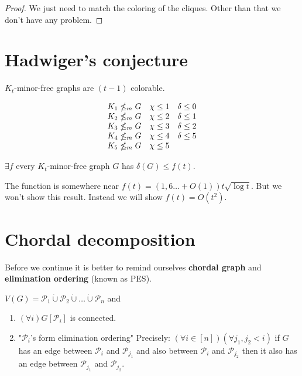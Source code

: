 \begin{proof}
	We just need to match the coloring of the cliques. Other than that we don't have any problem.
\end{proof}

\section{Hadwiger's conjecture}

$K_{t}$-minor-free graphs are $(t-1)$ colorable.

$$
\begin{array}{c c c}
	K_{1} \nleq_{m} G & \chi \leq 1 & \delta \leq 0 \\
	K_{2} \nleq_{m} G & \chi \leq 2 & \delta \leq 1 \\
	K_{3} \nleq_{m} G & \chi \leq 3 & \delta \leq 2 \\
	K_{4} \nleq_{m} G & \chi \leq 4 & \delta \leq 5 \\
	K_{5} \nleq_{m} G & \chi \leq 5 & \\
\end{array}
$$

\begin{thm}
	$\exists f$ every $K_{t}$-minor-free graph $G$ has $\delta(G) \leq f(t)$.
\end{thm}

The function is somewhere near $f(t) = (1,6\dots + O(1)) t \sqrt{\log t}$. But we won't show this result. Instead we will show $f(t) = O(t^{2})$.

\section{Chordal decomposition}

Before we continue it is better to remind ourselves \textbf{chordal graph} and \textbf{elimination ordering} (known as PES).

\begin{defn}
	$V(G) = \mathcal{P}_{1} \dot{\cup} \mathcal{P}_{2} \dot{\cup} \dots \dot{\cup} \mathcal{P}_{n}$ and
	
	\begin{enumerate}
		\item $(\forall i) G[\mathcal{P}_{i}]$ is connected.
		\item "$\mathcal{P}_{i}$'s form elimination ordering" Precisely: $(\forall i \in [n])(\forall j_{1},j_{2} < i)$ if $G$ has an edge between $\mathcal{P}_{i}$ and $\mathcal{P}_{j_{1}}$ and also between $\mathcal{P}_{i}$ and $\mathcal{P}_{j_{2}}$ then it also has an edge between $\mathcal{P}_{j_{1}}$ and $\mathcal{P}_{j_{2}}$.
	\end{enumerate}
\end{defn}

